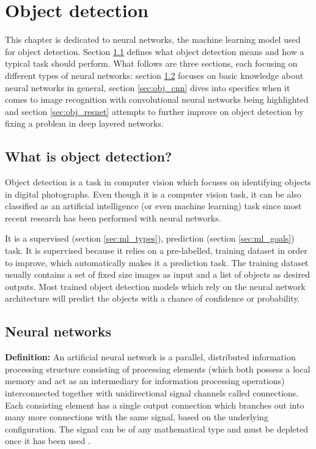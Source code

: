 \chapter{Object detection}
\label{chap:obj}

This chapter is dedicated to neural networks, the machine learning model used for object detection. Section \ref{sec:obj_what} defines what object detection means and how a typical task should perform. What follows are three sections, each focusing on different types of neural networks: section \ref{sec:obj_nn} focuses on basic knowledge about neural networks in general, section \ref{sec:obj_cnn} dives into specifics when it comes to image recognition with convolutional neural networks being highlighted and section \ref{sec:obj_resnet} attempts to further improve on object detection by fixing a problem in deep layered networks.

\section{What is object detection?}
\label{sec:obj_what}

Object detection is a task in computer vision which focuses on identifying objects in digital photographs. Even though it is a computer vision task, it can be also classified as an artificial intelligence (or even machine learning) task since most recent research has been performed with neural networks. 

It is a supervised (section \ref{sec:ml_types}), prediction (section \ref{sec:ml_goals}) task. It is supervised because it relies on a pre-labelled, training dataset in order to improve, which automatically makes it a prediction task. The training dataset usually contains a set of fixed size images as input and a list of objects as desired outputs. Most trained object detection models which rely on the neural network architecture will predict the objects with a chance of confidence or probability.

\section{Neural networks}
\label{sec:obj_nn}

\textbf{Definition:} An artificial neural network is a parallel, distributed information processing structure consisting of processing elements (which both possess a local memory and act as an intermediary for information processing operations) interconnected together with unidirectional signal channels called connections. Each consisting element has a single output connection which branches out into many more connections with the same signal, based on the underlying configuration. The signal can be of any mathematical type and must be depleted once it has been used \cite{backpropagation}.

